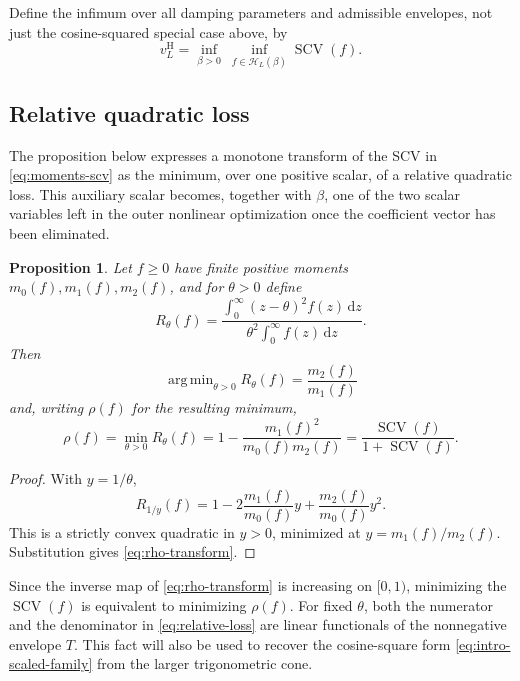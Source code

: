 \documentclass[11pt]{article}
\numberwithin{equation}{section}
\newtheorem{proposition}[theorem]{Proposition}
\theoremstyle{remark}
\newcommand{\SCV}{\operatorname{SCV}}
\newcommand{\dd}{\,\mathrm d}
\newcommand{\Hcal}{\mathcal H}
\newcommand{\vH}{v^{\mathrm H}}
\DeclareMathOperator*{\argmin}{arg\,min}
\begin{document}
Define the infimum over all damping parameters and admissible envelopes, not just the cosine-squared special case above, by
\[
  \vH_L
  =\inf_{\beta>0}\ \inf_{f\in\Hcal_L(\beta)}\SCV(f).
\]

\subsection{Relative quadratic loss}

The proposition below expresses a monotone transform of the SCV in \eqref{eq:moments-scv} as the minimum, over one positive scalar, of a relative quadratic loss. This auxiliary scalar becomes, together with $\beta$, one of the two scalar variables left in the outer nonlinear optimization once the coefficient vector has been eliminated.

\begin{proposition}\label{prop:relative-loss}
Let $f\geq0$ have finite positive moments $m_0(f),m_1(f),m_2(f)$, and for $\theta>0$ define
\begin{equation}\label{eq:relative-loss}
  R_\theta(f)
  =\frac{\int_0^\infty(z-\theta)^2f(z)\dd z}
         {\theta^2\int_0^\infty f(z)\dd z}.
\end{equation}
Then
\begin{equation}\label{eq:theta-star}
 { \argmin_{\theta>0}R_\theta(f)=\frac{m_2(f)}{m_1(f)}}
\end{equation}
and, writing $\rho(f)$ for the resulting minimum,
\begin{equation}\label{eq:rho-transform}
{
  \rho(f)=\min_{\theta>0}R_\theta(f)
  =1-\frac{m_1(f)^2}{m_0(f)m_2(f)}
  =\frac{\SCV(f)}{1+\SCV(f)}.}
\end{equation}
\end{proposition}

\begin{proof}
With $y=1/\theta$,
\[
  R_{1/y}(f)
  =1-2\frac{m_1(f)}{m_0(f)}y+\frac{m_2(f)}{m_0(f)}y^2.
\]
This is a strictly convex quadratic in $y>0$, minimized at $y=m_1(f)/m_2(f)$. Substitution gives \eqref{eq:rho-transform}.

\end{proof}

Since the inverse map of \eqref{eq:rho-transform} is increasing on $[0,1)$, minimizing the $\SCV(f)$ is equivalent to minimizing $\rho(f)$. For fixed $\theta$, both the numerator and the denominator in \eqref{eq:relative-loss} are linear functionals of the nonnegative envelope $T$. This fact will also be used to recover the cosine-square form \eqref{eq:intro-scaled-family} from the larger trigonometric cone.
\end{document}
